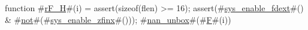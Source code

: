 function #\hyperref[sailRISCVzrFzyH]{rF\_H}#(i) = {
  assert(sizeof(flen) >= 16);
  assert(#\hyperref[sailRISCVzsyszyenablezyfdext]{sys\_enable\_fdext}#() & #\hyperref[sailRISCVznot]{not}#(#\hyperref[sailRISCVzsyszyenablezyzzfinx]{sys\_enable\_zfinx}#()));
  #\hyperref[sailRISCVznanzyunbox]{nan\_unbox}#(#\hyperref[sailRISCVzF]{F}#(i))
}
